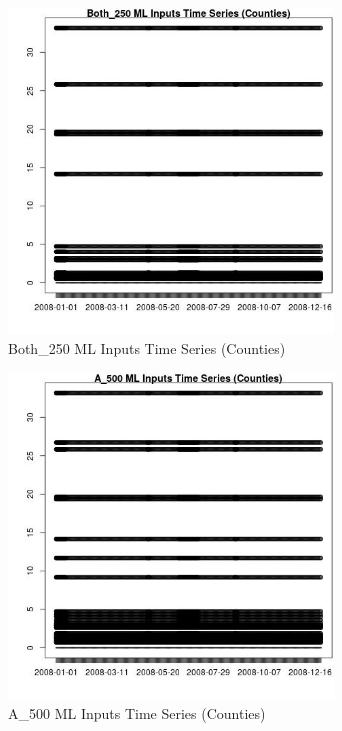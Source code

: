 \begin{figure} 
\centering  
\includegraphics[width=0.77\textwidth]{Code_Outputs/ML_input_report_ML_input_CountyGeometricCentroids_Locations_Dates_part_c_2008-01-01to2008-12-31_Both_250TS.jpg} 
\caption{\label{fig:ML_input_report_ML_input_CountyGeometricCentroids_Locations_Dates_part_c_2008-01-01to2008-12-31Both_250TS}Both_250 ML Inputs Time Series (Counties)} 
\end{figure} 
 

\begin{figure} 
\centering  
\includegraphics[width=0.77\textwidth]{Code_Outputs/ML_input_report_ML_input_CountyGeometricCentroids_Locations_Dates_part_c_2008-01-01to2008-12-31_A_500TS.jpg} 
\caption{\label{fig:ML_input_report_ML_input_CountyGeometricCentroids_Locations_Dates_part_c_2008-01-01to2008-12-31A_500TS}A_500 ML Inputs Time Series (Counties)} 
\end{figure} 
 

